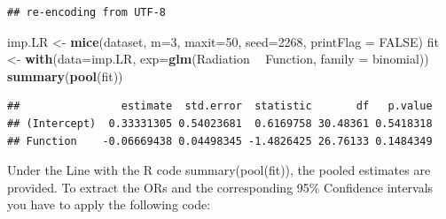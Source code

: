 \documentclass[]{book}
\newenvironment{Shaded}{\begin{snugshade}}{\end{snugshade}}
\newcommand{\KeywordTok}[1]{\textcolor[rgb]{0.13,0.29,0.53}{\textbf{#1}}}
\newcommand{\DataTypeTok}[1]{\textcolor[rgb]{0.13,0.29,0.53}{#1}}
\newcommand{\DecValTok}[1]{\textcolor[rgb]{0.00,0.00,0.81}{#1}}
\newcommand{\StringTok}[1]{\textcolor[rgb]{0.31,0.60,0.02}{#1}}
\newcommand{\CommentTok}[1]{\textcolor[rgb]{0.56,0.35,0.01}{\textit{#1}}}
\newcommand{\OtherTok}[1]{\textcolor[rgb]{0.56,0.35,0.01}{#1}}
\newcommand{\OperatorTok}[1]{\textcolor[rgb]{0.81,0.36,0.00}{\textbf{#1}}}
\newcommand{\NormalTok}[1]{#1}
\begin{document}
\begin{verbatim}
## re-encoding from UTF-8
\end{verbatim}

\begin{Shaded}
\begin{Highlighting}[]
\NormalTok{imp.LR <-}\StringTok{ }\KeywordTok{mice}\NormalTok{(dataset, }\DataTypeTok{m=}\DecValTok{3}\NormalTok{, }\DataTypeTok{maxit=}\DecValTok{50}\NormalTok{, }\DataTypeTok{seed=}\DecValTok{2268}\NormalTok{, }\DataTypeTok{printFlag =} \OtherTok{FALSE}\NormalTok{)}
\NormalTok{fit <-}\StringTok{ }\KeywordTok{with}\NormalTok{(}\DataTypeTok{data=}\NormalTok{imp.LR, }\DataTypeTok{exp=}\KeywordTok{glm}\NormalTok{(Radiation }\OperatorTok{~}\StringTok{ }\NormalTok{Function, }\DataTypeTok{family =}\NormalTok{ binomial))}
\KeywordTok{summary}\NormalTok{(}\KeywordTok{pool}\NormalTok{(fit))}
\end{Highlighting}
\end{Shaded}

\begin{verbatim}
##                estimate  std.error  statistic       df   p.value
## (Intercept)  0.33331305 0.54023681  0.6169758 30.48361 0.5418318
## Function    -0.06669438 0.04498345 -1.4826425 26.76133 0.1484349
\end{verbatim}

\begin{Shaded}
\end{Shaded}

Under the Line with the R code summary(pool(fit)), the pooled estimates
are provided. To extract the ORs and the corresponding 95\% Confidence
intervals you have to apply the following code:

\begin{Shaded}
\end{Shaded}
\end{document}
